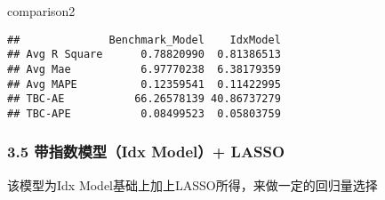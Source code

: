 \documentclass[]{article}
\newenvironment{Shaded}{\begin{snugshade}}{\end{snugshade}}
\newcommand{\NormalTok}[1]{#1}
\begin{document}
\begin{Shaded}
\begin{Highlighting}[]
\NormalTok{comparison2}
\end{Highlighting}
\end{Shaded}

\begin{verbatim}
##              Benchmark_Model    IdxModel
## Avg R Square      0.78820990  0.81386513
## Avg Mae           6.97770238  6.38179359
## Avg MAPE          0.12359541  0.11422995
## TBC-AE           66.26578139 40.86737279
## TBC-APE           0.08499523  0.05803759
\end{verbatim}

\subsubsection{3.5 带指数模型（Idx Model）+
LASSO}\label{idx-model-lasso}

该模型为Idx Model基础上加上LASSO所得，来做一定的回归量选择
\end{document}
